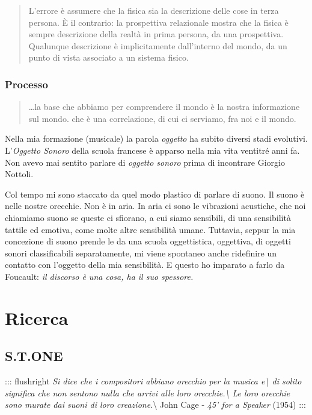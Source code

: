 \documentclass[a4paper,11pt]{article}
\begin{document}
\begin{quote}
L'errore è assumere che la fisica sia la descrizione delle cose in
terza persona. È il contrario: la prospettiva relazionale mostra che
la fisica è sempre descrizione della realtà in prima persona, da una
prospettiva. Qualunque descrizione è implicitamente dall'interno del
mondo, da un punto di vista associato a un sistema fisico.
\end{quote}

\subsubsection{Processo}\hypertarget{processo}{}\label{processo}

\begin{quote}
\ldots{}la base che abbiamo per comprendere il mondo è la nostra
informazione sul mondo. che è una correlazione, di cui ci serviamo,
fra noi e il mondo.
\end{quote}

Nella mia formazione (musicale) la parola \emph{oggetto} ha subito diversi
stadi evolutivi. L'\emph{Oggetto Sonoro} della scuola francese è apparso
nella mia vita ventitré anni fa. Non avevo mai sentito parlare di
\emph{oggetto sonoro} prima di incontrare Giorgio Nottoli.

Col tempo mi sono staccato da quel modo plastico di parlare di suono. Il
suono è nelle nostre orecchie. Non è in aria. In aria ci sono le
vibrazioni acustiche, che noi chiamiamo suono se queste ci sfiorano, a
cui siamo sensibili, di una sensibilità tattile ed emotiva, come molte
altre sensibilità umane. Tuttavia, seppur la mia concezione di suono
prende le da una scuola oggettistica, oggettiva, di oggetti sonori
classificabili separatamente, mi viene spontaneo anche ridefinire un
contatto con l'oggetto della mia sensibilità. E questo ho imparato a
farlo da Foucault: \emph{il discorso è una cosa, ha il suo spessore.}

\section{Ricerca}\hypertarget{ricerca}{}\label{ricerca}

\subsection{S.T.ONE}\hypertarget{stone}{}\label{stone}

::: flushright
\emph{Si dice che i compositori abbiano orecchio per la musica e\textbackslash{}
di solito significa che non sentono nulla che arrivi alle loro
orecchie.\textbackslash{}
Le loro orecchie sono murate dai suoni di loro creazione.}\textbackslash{}
John Cage - \emph{45' for a Speaker} (1954)
:::
\end{document}
